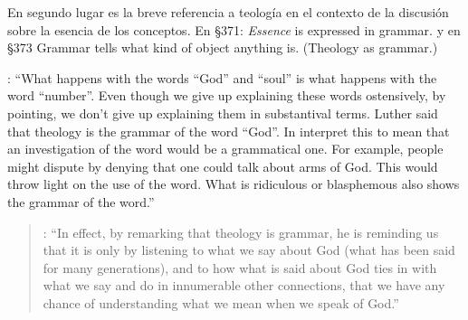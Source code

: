 En segundo lugar es la breve referencia a teología en el contexto de la discusión sobre la esencia de los conceptos. En \S371: \emph{Essence} is expressed in grammar. y en \S373 Grammar tells what kind of object anything is. (Theology as grammar.)

\cite[32]{ambrose2001lectures}: \enquote{What happens with the words ``God'' and ``soul'' is what happens with the word ``number''. Even though we give up explaining these words ostensively, by pointing, we don't give up explaining them in substantival terms. \textelp{} Luther said that theology is the grammar of the word ``God''. In interpret this to mean that an investigation of the word would be a grammatical one. For example, people might dispute by denying that one could talk about arms of God. This would throw light on the use of the word. What is ridiculous or blasphemous also shows the grammar of the word.}

\blockquote[{\cite[148--149]{kerr1997theo}}: \enquote{In effect, by remarking that theology is grammar, he is reminding us that it is only by listening to what we say about God (what has been said for many generations), and to how what is said about God ties in with what we say and do in innumerable other connections, that we have any chance of understanding what we mean when we speak of God.}]{}
